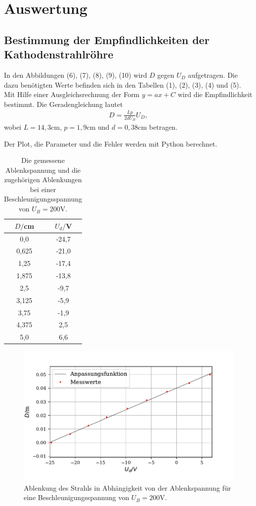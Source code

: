 \section{Auswertung}
\label{sec:Auswertung}
\subsection{Bestimmung der Empfindlichkeiten der Kathodenstrahlröhre}

In den Abbildungen (6), (7), (8), (9), (10) wird $D$ gegen $U_D$ aufgetragen. Die dazu benötigten Werte befinden sich in den Tabellen (1), (2), (3), (4) und (5).
Mit Hilfe einer Ausgleichsrechnung der Form $y = ax + C$ wird die Empfindlichkeit bestimmt.
Die Geradengleichung lautet
\begin{align*}
D = \frac{Lp}{2dU_B}U_D ,
\end{align*}
wobei $L = 14,3 \si{\cm}$, $p = 1,9 \si{\cm} $ und $d = 0,38 \si{\cm}$ betragen.

\noindent Der Plot, die Parameter und die Fehler werden mit Python berechnet.

\begin{table}[H]
  \centering
  \caption{Die gemessene Ablenkspannung und die zugehörigen Ablenkungen bei einer Beschleunigungsspannung von $U_B = 200 \si{\volt}$.}
  \label{tab:Parameter}
  \begin{tabular}{c c}
    \toprule
    $D/$cm& $U_d/$V \\
    \bottomrule
    0,0 & -24,7 \\
     0,625 & -21,0  \\
     1,25 & -17,4 \\
     1,875 & -13,8  \\
     2,5 & -9,7 \\
     3,125 & -5,9  \\
     3,75& -1,9  \\
     4,375 & 2,5  \\
     5,0 &  6,6 \\
     \bottomrule
  \end{tabular}
\end{table}

\begin{figure}[H]
  \centering
  \includegraphics{plot3.pdf}
  \caption{Ablenkung des Strahls in Abhängigkeit von der Ablenkspannung für eine Beschleunigungsspannung von $U_B = 200 \si{\volt}$. }
  \label{fig:plot}
\end{figure}

